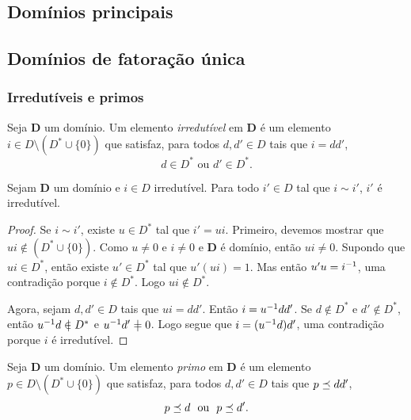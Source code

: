 \subsection{Domínios principais}

\subsection{Domínios de fatoração única}

\subsubsection{Irredutíveis e primos}

\begin{definition}
Seja $\bm D$ um domínio. Um elemento \emph{irredutível} em $\bm D$ é um elemento $i \in D \setminus (D^* \cup \{0\})$ que satisfaz, para todos $d,d' \in D$ tais que $i=dd'$,
		\begin{equation*}
		d \in D^* \text{\ \ ou\ \ } d' \in D^*.
		\end{equation*}
\end{definition}

\begin{proposition}
Sejam $\bm D$ um domínio e $i \in D$ irredutível. Para todo $i' \in D$ tal que $i \sim i'$, $i'$ é irredutível.
\end{proposition}
\begin{proof}
Se $i \sim i'$, existe $u\in D^*$ tal que $i'=ui$. Primeiro, devemos mostrar que $ui \notin (D^* \cup \{0\})$. Como $u \neq 0$ e $i \neq 0$ e $\bm D$ é domínio, então $ui \neq 0$. Supondo que $ui \in D^*$, então existe $u' \in D^*$ tal que $u'(ui)=1$. Mas então $u'u=i^{-1}$, uma contradição porque $i \notin D^*$. Logo $ui \notin D^*$.

Agora, sejam $d,d' \in D$ tais que $ui=dd'$. Então $i=u^{-1} dd'$. Se $d \notin D^*$ e $d' \notin D^*$, então $u\inv d \notin D^*$ e $u\inv d' \neq 0$. Logo segue que $i=(u^{-1} d)d'$, uma contradição porque $i$ é irredutível.
\end{proof}

\begin{definition}
Seja $\bm D$ um domínio. Um elemento \emph{primo} em $\bm D$ é um elemento $p \in D\setminus (D^* \cup \{0\})$ que satisfaz, para todos $d,d' \in D$ tais que $p \preceq dd'$,
		\begin{equation*}
		p \preceq d \text{\ \ ou\ \ } p \preceq d'.
		\end{equation*}
\end{definition}


